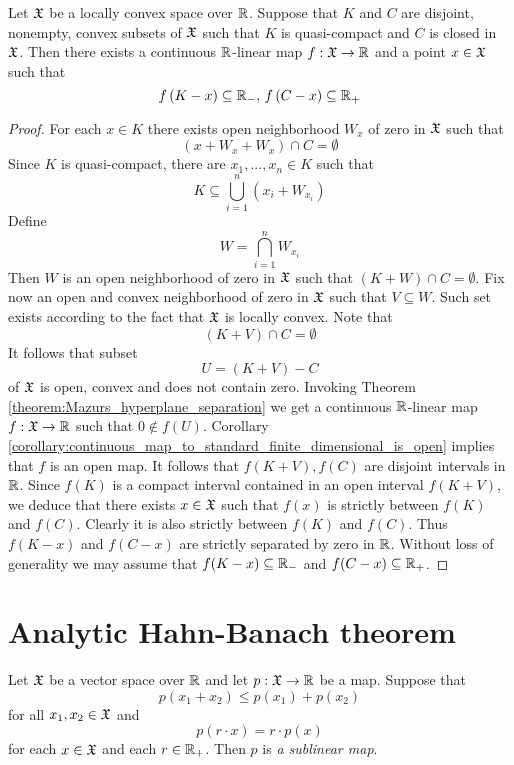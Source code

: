 \begin{theorem}\label{theorem:separation_in_locally_convex_spaces}
Let ${\mathfrak X}$ be a locally convex space over ${\mathbb R}$. Suppose that $K$ and $C$ are disjoint, nonempty, convex subsets of ${\mathfrak X}$ such that $K$ is quasi-compact and $C$ is closed in ${\mathfrak X}$. Then there exists a continuous ${\mathbb R}$-linear map $f:{\mathfrak X}\rightarrow {\mathbb R}$ and a point $x \in {\mathfrak X}$ such that
$$f\left(K - x\right) \subseteq {\mathbb R}_-,\,f\left(C - x\right)\subseteq {\mathbb R}_+$$
\end{theorem}
\begin{proof}
For each $x \in K$ there exists open neighborhood $W_x$ of zero in ${\mathfrak X}$ such that 
$$\left(x + W_x + W_x\right)\cap C = \emptyset$$ 
Since $K$ is quasi-compact, there are $x_1,...,x_n\in K$ such that 
$$K \subseteq \bigcup_{i=1}^n\left(x_i + W_{x_i}\right)$$
Define
$$W = \bigcap_{i=1}^nW_{x_i}$$
Then $W$ is an open neighborhood of zero in ${\mathfrak X}$ such that $\left(K + W\right)\cap C = \emptyset$. Fix now an open and convex neighborhood of zero in ${\mathfrak X}$ such that $V \subseteq W$. Such set exists according to the fact that ${\mathfrak X}$ is locally convex. Note that 
$$\left(K + V\right)\cap C = \emptyset$$
It follows that subset 
$$U = \left(K + V\right) - C$$
of ${\mathfrak X}$ is open, convex and does not contain zero. Invoking Theorem \ref{theorem:Mazurs_hyperplane_separation} we get a continuous ${\mathbb R}$-linear map $f:{\mathfrak X} \rightarrow {\mathbb R}$ such that $0 \not \in f\left(U\right)$. Corollary \ref{corollary:continuous_map_to_standard_finite_dimensional_is_open} implies that $f$ is an open map. It follows that $f\left(K + V\right),f\left(C\right)$ are disjoint intervals in ${\mathbb R}$. Since $f(K)$ is a compact interval contained in an open interval $f(K + V)$, we deduce that there exists $x \in {\mathfrak X}$ such that $f(x)$ is strictly between $f\left(K\right)$ and $f\left(C\right)$. Clearly it is also strictly between $f(K)$ and $f(C)$. Thus $f(K - x)$ and $f(C - x)$ are strictly separated by zero in ${\mathbb R}$. Without loss of generality we may assume that $f(K - x) \subseteq {\mathbb R}_-$ and $f(C - x)\subseteq {\mathbb R}_+$.
\end{proof}

\section{Analytic Hahn-Banach theorem}

\begin{definition}
Let ${\mathfrak X}$ be a vector space over ${\mathbb R}$ and let $p:{\mathfrak X}\rightarrow {\mathbb R}$ be a map. Suppose that
$$p(x_1 + x_2)\leq p(x_1) + p(x_2)$$
for all $x_1,x_2\in {\mathfrak X}$ and 
$$p(r\cdot x) = r\cdot p(x)$$
for each $x\in {\mathfrak X}$ and each $r\in {\mathbb R}_+$. Then $p$ is \textit{a sublinear map}.
\end{definition}

